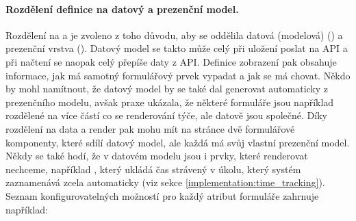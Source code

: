 \paragraph{Rozdělení definice na datový a prezenční model.} Rozdělení na  a  je zvoleno z toho důvodu, aby se oddělila datová (modelová) () a prezenční vrstva (). Datový model se takto může celý při uložení poslat na API a při načtení se naopak celý přepíše daty z API. Definice zobrazení pak obsahuje informace, jak má samotný formulářový prvek vypadat a jak se má chovat. Někdo by mohl namítnout, že datový model by se také dal generovat automaticky z prezenčního modelu, avšak praxe ukázala, že některé formuláře jsou například rozdělené na více částí co se renderování týče, ale datově jsou společné. Díky rozdělení na data a render pak mohu mít na stránce dvě formulářové komponenty, které sdílí datový model, ale každá má svůj vlastní prezenční model. Někdy se také hodí, že v datovém modelu jsou i prvky, které renderovat nechceme, například , který ukládá čas strávený v úkolu, který systém zaznamenává zcela automaticky (viz sekce \ref{implementation:time_tracking}). \\
Seznam konfigurovatelných možností pro každý atribut formuláře zahrnuje například:

